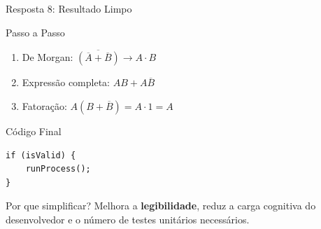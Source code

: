 \documentclass[9pt]{beamer}
\begin{document}
\begin{frame}[fragile]{Resposta 8: Resultado Limpo}

\begin{alertblock}{Passo a Passo}
\begin{enumerate}
    \item De Morgan: $\overline{(\overline{A} + \overline{B})} \rightarrow A \cdot B$
    \item Expressão completa: $AB + A\overline{B}$
    \item Fatoração: $A(B + \overline{B}) = A \cdot 1 = A$
\end{enumerate}
\end{alertblock}

\begin{block}{Código Final}
\begin{verbatim}
if (isValid) {
    runProcess();
}
\end{verbatim}
\end{block}

\vspace{0.4cm}
\begin{block}{Por que simplificar?}
Melhora a \textbf{legibilidade}, reduz a carga cognitiva do desenvolvedor e o número de testes unitários necessários.
\end{block}

\end{frame}
\end{document}
